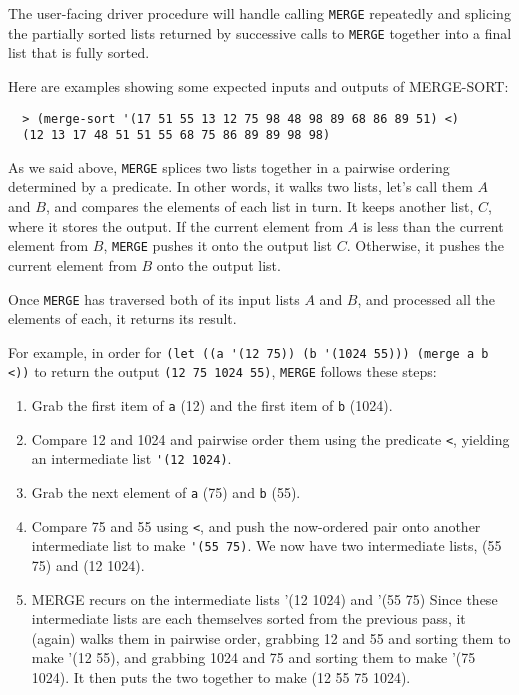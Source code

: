 \documentclass[12pt,openright,draft]{book}
\begin{document}
The user-facing driver procedure will handle calling \verb|MERGE|
repeatedly and splicing the partially sorted lists returned by
successive calls to \verb|MERGE| together into a final list that is
fully sorted.

Here are examples showing some expected inputs and outputs of
MERGE-SORT:

\begin{verbatim}
  > (merge-sort '(17 51 55 13 12 75 98 48 98 89 68 86 89 51) <)
  (12 13 17 48 51 51 55 68 75 86 89 89 98 98)
\end{verbatim}

As we said above, \verb|MERGE| splices two lists together in a
pairwise ordering determined by a predicate.  In other words, it walks
two lists, let's call them $A$ and $B$, and compares the elements of
each list in turn.  It keeps another list, $C$, where it stores the
output.  If the current element from $A$ is less than the current
element from $B$, \verb|MERGE| pushes it onto the output list $C$.
Otherwise, it pushes the current element from $B$ onto the output
list.

Once \verb|MERGE| has traversed both of its input lists $A$ and $B$,
and processed all the elements of each, it returns its result.

For example, in order for
\verb|(let ((a '(12 75)) (b '(1024 55))) (merge a b <))| to return the
output \verb|(12 75 1024 55)|, \verb|MERGE| follows these steps:

\begin{enumerate}

\item Grab the first item of \verb|a| (12) and the first item of
  \verb|b| (1024).

\item Compare 12 and 1024 and pairwise order them using the predicate
  \verb|<|, yielding an intermediate list \verb|'(12 1024)|.

\item Grab the next element of \verb|a| (75) and \verb|b| (55).

\item Compare 75 and 55 using \verb|<|, and push the now-ordered pair
  onto another intermediate list to make \verb|'(55 75)|.  We now have
  two intermediate lists, (55 75) and (12 1024).

\item MERGE recurs on the intermediate lists '(12 1024) and '(55 75)
  Since these intermediate lists are each themselves sorted from the
  previous pass, it (again) walks them in pairwise order, grabbing 12
  and 55 and sorting them to make '(12 55), and grabbing 1024 and 75
  and sorting them to make '(75 1024).  It then puts the two together
  to make (12 55 75 1024).
  
\end{enumerate}
\end{document}
